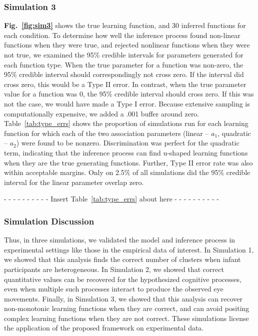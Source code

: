 \documentclass[12pt]{article}
\begin{document}
\subsubsection{Simulation 3}

	\textbf{Fig.~\ref{fig:sim3}} shows the true learning function, and 30 inferred functions for each condition. To determine how well the inference process found non-linear functions when they were true, and rejected nonlinear functions when they were not true, we examined the 95\% credible intervals for parameters generated for each function type. When the true parameter for a function was non-zero, the 95\% credible interval should correspondingly not cross zero. If the interval did cross zero, this would be a Type II error. In contrast, when the true parameter value for a function was 0, the 95\% credible interval should cross zero. If this was not the case, we would have made a Type I error. Because extensive sampling is computationally expensive, we added a .001 buffer around zero. Table~\ref{tab:type_errs} shows the proportion of simulations run for each learning function for which each of the two association parameters (linear -- $a_{1}$, quadratic -- $a_{2}$) were found to be nonzero. Discrimination was perfect for the quadratic term, indicating that the inference process can find u-shaped learning functions when they are the true generating functions. Further, Type II error rate was also within acceptable margins. Only on 2.5\% of all simulations did the 95\% credible interval for the linear parameter overlap zero. 

\begin{center}- - - - - - - - - - Insert Table~\ref{tab:type_errs} about here - - - - - - - - - -\end{center}

\subsubsection*{Simulation Discussion} 

	Thus, in three simulations, we validated the model and inference process in experimental settings like those in the empirical data of interest. In Simulation 1, we showed that this analysis finds the correct number of clusters when infant participants are heterogeneous. In Simulation 2, we showed that correct quantitative values can be recovered for the hypothesized cognitive processes, even when multiple such processes interact to produce the observed eye movements. Finally, in Simulation 3, we showed that this analysis can recover non-monotonic learning functions when they are correct, and can avoid positing complex learning functions when they are not correct. These simulations license the application of the proposed framework on experimental data.
\end{document}
